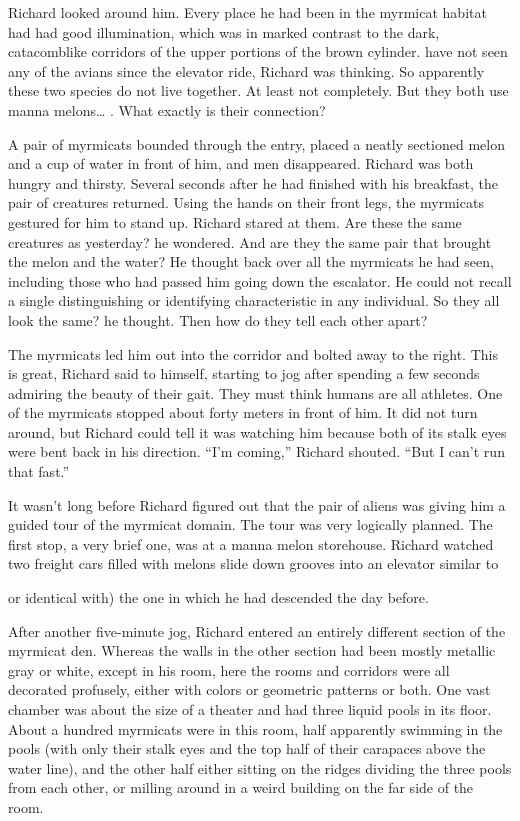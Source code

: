 \documentclass[]{article}
\begin{document}
{Richard looked around him.  Every place he had been in the myrmicat habitat had had good illumination, which was in marked contrast to the dark, catacomblike corridors of the upper portions of the brown cylinder.  have not seen any of the avians since the elevator ride, Richard was thinking.  So apparently these two species do not live together.  At least not completely.  But they both use manna melons… .  What exactly is their connection?

A pair of myrmicats bounded through the entry, placed a neatly sectioned melon and a cup of water in front of him, and men disappeared.  Richard was both hungry and thirsty.  Several seconds after he had finished with his breakfast, the pair of creatures returned.  Using the hands on their front legs, the myrmicats gestured for him to stand up.  Richard stared at them.  Are these the same creatures as yesterday? he wondered.  And are they the same pair that brought the melon and the water? He thought back over all the myrmicats he had seen, including those who had passed him going down the escalator.  He could not recall a single distinguishing or identifying characteristic in any individual.  So they all look the same? he thought.  Then how do they tell each other apart?

The myrmicats led him out into the corridor and bolted away to the right.  This is great, Richard said to himself, starting to jog after spending a few seconds admiring the beauty of their gait.  They must think humans are all athletes.  One of the myrmicats stopped about forty meters in front of him.  It did not turn around, but Richard could tell it was watching him because both of its stalk eyes were bent back in his direction.  “I’m coming,” Richard shouted.  “But I can’t run that fast.”

It wasn’t long before Richard figured out that the pair of aliens was giving him a guided tour of the myrmicat domain.  The tour was very logically planned.  The first stop, a very brief one, was at a manna melon storehouse.  Richard watched two freight cars filled with melons slide down grooves into an elevator similar to {or identical with) the one in which he had descended the day before.
	
After another five-minute jog, Richard entered an entirely different section of the myrmicat den.  Whereas the walls in the other section had been mostly metallic gray or white, except in his room, here the rooms and corridors were all decorated profusely, either with colors or geometric patterns or both.  One vast chamber was about the size of a theater and had three liquid pools in its floor.  About a hundred myrmicats were in this room, half apparently swimming in the pools (with only their stalk eyes and the top half of their carapaces above the water line), and the other half either sitting on the ridges dividing the three pools from each other, or milling around in a weird building on the far side of the room.

}}
\end{document}
